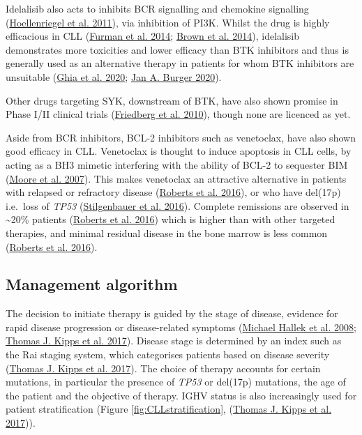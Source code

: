 \documentclass[11pt, a4paper, twosided]{book}
\begin{document}
Idelalisib also acts to inhibits BCR signalling and chemokine signalling (\protect\hyperlink{ref-Hoellenriegel2011}{Hoellenriegel et al. 2011}), via inhibition of PI3K. Whilst the drug is highly efficacious in CLL (\protect\hyperlink{ref-Furman2014}{Furman et al. 2014}; \protect\hyperlink{ref-Brown2014}{Brown et al. 2014}), idelalisib demonstrates more toxicities and lower efficacy than BTK inhibitors and thus is generally used as an alternative therapy in patients for whom BTK inhibitors are unsuitable (\protect\hyperlink{ref-Ghia2020}{Ghia et al. 2020}; \protect\hyperlink{ref-Burger2020}{Jan A. Burger 2020}).

Other drugs targeting SYK, downstream of BTK, have also shown promise in Phase I/II clinical trials (\protect\hyperlink{ref-Friedberg2010}{Friedberg et al. 2010}), though none are licenced as yet.

Aside from BCR inhibitors, BCL-2 inhibitors such as venetoclax, have also shown good efficacy in CLL. Venetoclax is thought to induce apoptosis in CLL cells, by acting as a BH3 mimetic interfering with the ability of BCL-2 to sequester BIM (\protect\hyperlink{ref-Moore2007}{Moore et al. 2007}). This makes venetoclax an attractive alternative in patients with relapsed or refractory disease (\protect\hyperlink{ref-Roberts2016}{Roberts et al. 2016}), or who have del(17p) i.e.~loss of \emph{TP53 }(\protect\hyperlink{ref-Stilgenbauer2016}{Stilgenbauer et al. 2016}). Complete remissions are observed in \textasciitilde20\% patients (\protect\hyperlink{ref-Roberts2016}{Roberts et al. 2016}) which is higher than with other targeted therapies, and minimal residual disease in the bone marrow is less common (\protect\hyperlink{ref-Roberts2016}{Roberts et al. 2016}).

\hypertarget{intro-management-algorithm}{%
\subsection{Management algorithm}\label{intro-management-algorithm}}

The decision to initiate therapy is guided by the stage of disease, evidence for rapid disease progression or disease-related symptoms (\protect\hyperlink{ref-Hallek2008}{Michael Hallek et al. 2008}; \protect\hyperlink{ref-Kipps2017}{Thomas J. Kipps et al. 2017}). Disease stage is determined by an index such as the Rai staging system, which categorises patients based on disease severity (\protect\hyperlink{ref-Kipps2017}{Thomas J. Kipps et al. 2017}). The choice of therapy accounts for certain mutations, in particular the presence of \emph{TP53} or del(17p) mutations, the age of the patient and the objective of therapy. IGHV status is also increasingly used for patient stratification (Figure \ref{fig:CLLstratification}, (\protect\hyperlink{ref-Kipps2017}{Thomas J. Kipps et al. 2017})).
\end{document}
